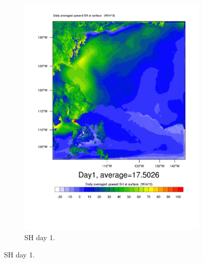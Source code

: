 \begin{figure}
\begin{subfigure}{0.48\textwidth}
		\includegraphics[width=\textwidth]{results/control/HFX_Day1.pdf}
		\caption{SH day 1.}
		\label{subfig:sh_r1Day1}
	\end{subfigure}
	

\end{figure}
